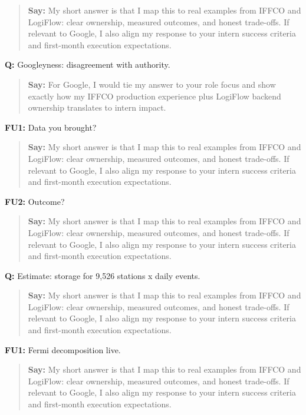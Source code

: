 \documentclass[9pt,a4paper]{article}
\begin{document}
\begin{quote}\small\textbf{Say:} My short answer is that I map this to real examples from IFFCO and LogiFlow: clear ownership, measured outcomes, and honest trade-offs. If relevant to Google, I also align my response to your intern success criteria and first-month execution expectations.\end{quote}
\vspace{2mm}
\textbf{Q:} Googleyness: disagreement with authority.

\begin{quote}\small\textbf{Say:} For Google, I would tie my answer to your role focus and show exactly how my IFFCO production experience plus LogiFlow backend ownership translates to intern impact.\end{quote}
\vspace{2mm}
\textbf{FU1:} Data you brought?

\begin{quote}\small\textbf{Say:} My short answer is that I map this to real examples from IFFCO and LogiFlow: clear ownership, measured outcomes, and honest trade-offs. If relevant to Google, I also align my response to your intern success criteria and first-month execution expectations.\end{quote}
\vspace{2mm}
\textbf{FU2:} Outcome?

\begin{quote}\small\textbf{Say:} My short answer is that I map this to real examples from IFFCO and LogiFlow: clear ownership, measured outcomes, and honest trade-offs. If relevant to Google, I also align my response to your intern success criteria and first-month execution expectations.\end{quote}
\vspace{2mm}
\textbf{Q:} Estimate: storage for 9,526 stations x daily events.

\begin{quote}\small\textbf{Say:} My short answer is that I map this to real examples from IFFCO and LogiFlow: clear ownership, measured outcomes, and honest trade-offs. If relevant to Google, I also align my response to your intern success criteria and first-month execution expectations.\end{quote}
\vspace{2mm}
\textbf{FU1:} Fermi decomposition live.

\begin{quote}\small\textbf{Say:} My short answer is that I map this to real examples from IFFCO and LogiFlow: clear ownership, measured outcomes, and honest trade-offs. If relevant to Google, I also align my response to your intern success criteria and first-month execution expectations.\end{quote}
\vspace{2mm}
\end{document}
